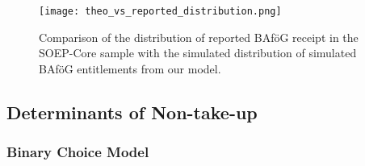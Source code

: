 \begin{figure}[htbp]
  \centering
  \texttt{[image: theo\_vs\_reported\_distribution.png]}
  \caption{Comparison of the distribution of reported BAföG receipt in the SOEP-Core sample with the simulated distribution of simulated BAföG entitlements from our model.}
  \label{fig:theo-vs-reported}
\end{figure}

\subsection{Determinants of Non-take-up}
\subsubsection{Binary Choice Model}

